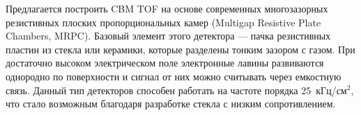 Предлагается построить CBM TOF на основе современных многозазорных резистивных плоских пропорциональных камер (Multigap Resistive Plate Chambers, MRPC). Базовый элемент этого детектора --- пачка резистивных пластин из стекла или керамики, которые разделены тонким зазором с газом. При достаточно высоком электрическом поле электронные лавины развиваются однородно по поверхности и сигнал от них можно считывать через емкостную связь.
Данный тип детекторов способен работать на частоте порядка 25~кГц/см$^2$, что стало возможным благодаря разработке стекла с низким сопротивлением.





